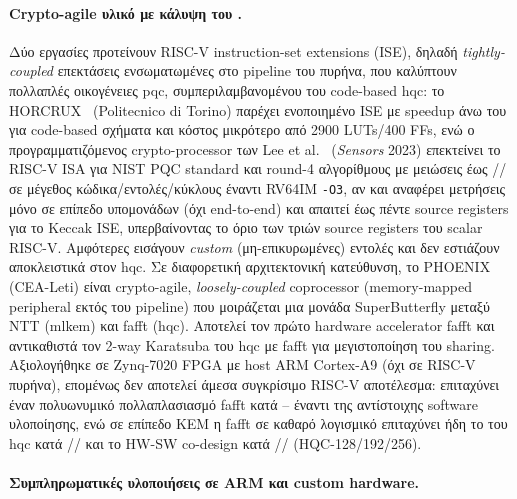 \paragraph{Crypto-agile υλικό με κάλυψη του \HQC.}
\label{ssec:rw-riscv-ise-hqc}

Δύο εργασίες προτείνουν RISC-V instruction-set extensions (ISE), δηλαδή
\emph{tightly-coupled} επεκτάσεις ενσωματωμένες στο pipeline του πυρήνα, που
καλύπτουν πολλαπλές οικογένειες \gls{pqc}, συμπεριλαμβανομένου του code-based
\gls{hqc}: το HORCRUX~\cite{Dolmeta2025-HORCRUX} (Politecnico di Torino) παρέχει
ενοποιημένο ISE με speedup άνω του  για code-based σχήματα και
κόστος μικρότερο από \num{2900} LUTs/\num{400} FFs, ενώ ο προγραμματιζόμενος
crypto-processor των Lee et al.~\cite{Lee2023-RISCV-PQC-CryptoProc}
(\emph{Sensors} 2023) επεκτείνει το RISC-V ISA για NIST PQC standard και round-4
αλγορίθμους με μειώσεις έως // σε μέγεθος
κώδικα/εντολές/κύκλους έναντι RV64IM \texttt{-O3}, αν και αναφέρει μετρήσεις
μόνο σε επίπεδο υπομονάδων (όχι end-to-end) και απαιτεί έως πέντε source
registers για το Keccak ISE, υπερβαίνοντας το όριο των τριών source registers
του scalar RISC-V. Αμφότερες εισάγουν \emph{custom} (μη-επικυρωμένες) εντολές
και δεν εστιάζουν αποκλειστικά στον \gls{hqc}. Σε διαφορετική αρχιτεκτονική
κατεύθυνση, το PHOENIX~\cite{PHOENIX2025} (CEA-Leti) είναι crypto-agile,
\emph{loosely-coupled} coprocessor (memory-mapped peripheral εκτός του pipeline)
που μοιράζεται μια μονάδα SuperButterfly μεταξύ NTT (\gls{mlkem}) και
\gls{fafft} (\gls{hqc}). Αποτελεί τον πρώτο hardware accelerator \gls{fafft} και
αντικαθιστά τον 2-way Karatsuba του \gls{hqc} με \gls{fafft} για μεγιστοποίηση
του sharing. Αξιολογήθηκε σε Zynq-7020 FPGA με host ARM Cortex-A9 (όχι σε RISC-V
πυρήνα), επομένως δεν αποτελεί άμεσα συγκρίσιμο RISC-V αποτέλεσμα: επιταχύνει
έναν πολυωνυμικό πολλαπλασιασμό \gls{fafft} κατά –
έναντι της αντίστοιχης software υλοποίησης, ενώ σε επίπεδο KEM η \gls{fafft} σε
καθαρό λογισμικό επιταχύνει ήδη το \Encaps του \gls{hqc} κατά
// και το HW-SW co-design κατά
// (HQC-128/192/256). 

\paragraph{Συμπληρωματικές υλοποιήσεις σε ARM και custom hardware.}
\label{ssec:rw-other-hw}

